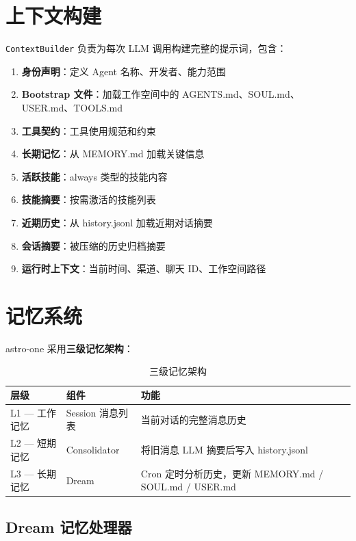 \documentclass[12pt,a4paper,UTF8]{ctexart}
\begin{document}
\section{上下文构建}

\texttt{ContextBuilder} 负责为每次 LLM 调用构建完整的提示词，包含：

\begin{enumerate}
    \item \textbf{身份声明}：定义 Agent 名称、开发者、能力范围
    \item \textbf{Bootstrap 文件}：加载工作空间中的 AGENTS.md、SOUL.md、USER.md、TOOLS.md
    \item \textbf{工具契约}：工具使用规范和约束
    \item \textbf{长期记忆}：从 MEMORY.md 加载关键信息
    \item \textbf{活跃技能}：always 类型的技能内容
    \item \textbf{技能摘要}：按需激活的技能列表
    \item \textbf{近期历史}：从 history.jsonl 加载近期对话摘要
    \item \textbf{会话摘要}：被压缩的历史归档摘要
    \item \textbf{运行时上下文}：当前时间、渠道、聊天 ID、工作空间路径
\end{enumerate}

\section{记忆系统}

astro-one 采用\textbf{三级记忆架构}：

\begin{table}[H]
\centering
\begin{tabular}{L{3cm} L{5cm} L{7cm}}
\toprule
\textbf{层级} & \textbf{组件} & \textbf{功能} \\
\midrule
L1 — 工作记忆 & Session 消息列表 & 当前对话的完整消息历史 \\
L2 — 短期记忆 & Consolidator & 将旧消息 LLM 摘要后写入 history.jsonl \\
L3 — 长期记忆 & Dream & Cron 定时分析历史，更新 MEMORY.md / SOUL.md / USER.md \\
\bottomrule
\end{tabular}
\caption{三级记忆架构}
\end{table}

\subsection{Dream 记忆处理器}
\end{document}
